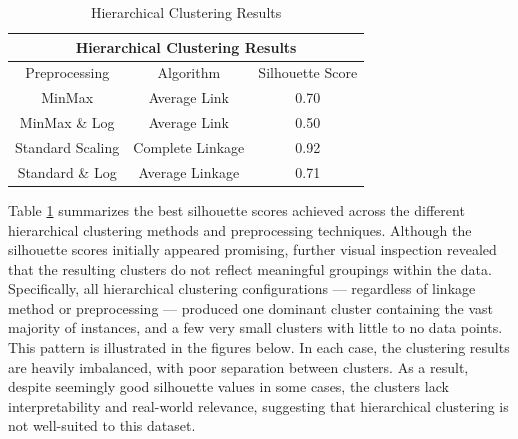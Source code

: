 \documentclass[10pt]{article}
\begin{document}
\begin{table}[ht!]
    \centering
    \begin{tabular}{|c|c|c|}
    \hline
    \multicolumn{3}{|c|}{Hierarchical Clustering Results} \\
    \hline
    Preprocessing & Algorithm & Silhouette Score \\
    \hline
    MinMax & Average Link & 0.70 \\
    MinMax \& Log & Average Link & 0.50 \\
    Standard Scaling & Complete Linkage & 0.92 \\
    Standard \& Log & Average Linkage & 0.71 \\
    \hline
    \end{tabular}
    \caption{Hierarchical Clustering Results}
    \label{table:Agg_Clustering}
\end{table}
Table \ref{table:Agg_Clustering} summarizes the best silhouette scores achieved across the different hierarchical clustering methods and preprocessing techniques. \newline
Although the silhouette scores initially appeared promising, further visual inspection revealed that the resulting clusters do not reflect meaningful groupings within the data. Specifically, all hierarchical clustering configurations — regardless of linkage method or preprocessing — produced one dominant cluster containing the vast majority of instances, and a few very small clusters with little to no data points. \newline
This pattern is illustrated in the figures below. In each case, the clustering results are heavily imbalanced, with poor separation between clusters. As a result, despite seemingly good silhouette values in some cases, the clusters lack interpretability and real-world relevance, suggesting that hierarchical clustering is not well-suited to this dataset.
\end{document}
